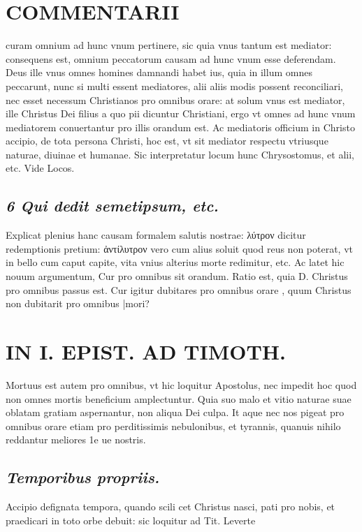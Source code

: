\documentclass{article}
\begin{document}
\begin{pages}
\section*{COMMENTARII }
\marginpar{[ p.50 ]}\pstart curam omnium ad hunc vnum pertinere, sic quia vnus tantum est mediator: consequens est, omnium peccatorum causam ad hunc vnum esse deferendam. Deus ille vnus omnes homines damnandi habet ius, quia in illum omnes peccarunt, nunc si multi essent mediatores, alii aliis modis possent reconciliari, nec esset necessum Christianos pro omnibus orare: at solum vnus est mediator, ille Christus Dei filius a quo pii dicuntur Christiani, ergo vt omnes ad hunc vnum mediatorem conuertantur pro illis orandum est. Ac mediatoris officium in Christo accipio, de tota persona Christi, hoc est, vt sit mediator respectu vtriusque naturae, diuinae et humanae. Sic interpretatur locum hunc Chrysostomus, et alii, etc. Vide Locos.  \pend
{}
{}
\subsection*{\textit{6 Qui dedit semetipsum, etc. }}\pstart Explicat plenius hanc causam formalem salutis nostrae: λύτρον dicitur redemptionis pretium: ἀντίλυτρον vero cum alius soluit quod reus non poterat, vt in bello cum caput capite, vita vnius alterius morte redimitur, etc.  \pend\pstart Ac latet hic nouum argumentum, Cur pro omnibus sit orandum. Ratio est, quia D. Christus pro omnibus passus est. Cur igitur dubitares pro omnibus orare , quum Christus non dubitarit pro omnibus |mori?  \pend
\section*{IN I. EPIST. AD TIMOTH. }
\marginpar{[ p.5 ]}\pstart Mortuus est autem pro omnibus, vt hic loquitur Apostolus, nec impedit hoc quod non omnes mortis beneficium amplectuntur. Quia suo malo et vitio naturae suae oblatam gratiam aspernantur, non aliqua Dei culpa. It aque nec nos pigeat pro omnibus orare etiam pro perditissimis nebulonibus, et tyrannis, quanuis nihilo reddantur meliores 1e ue nostris.  \pend
{}
{}
\subsection*{\textit{Temporibus propriis. }}\pstart Accipio defignata tempora, quando scili cet Christus nasci, pati pro nobis, et praedicari in toto orbe debuit: sic loquitur ad Tit. Leverte\pend
{}
{}

\end{pages}
\end{document}
